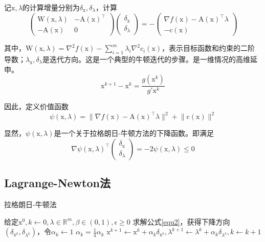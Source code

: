 \documentclass[a4paper]{D:/repositories/MyDGP/latex/PaperReadingLog}
\begin{document}
 记$\mathrm{x},\lambda$的计算增量分别为$\delta_\mathrm{x},\delta_\lambda$，计算
\begin{equation}    
    \label{equ2}
     \begin{pmatrix}
    \mathrm{W}(\mathrm{x},\lambda) & -\mathrm{A}(\mathrm{x})^\top\\
    -\mathrm{A}(\mathrm{x}) & 0
    \end{pmatrix}
    \begin{pmatrix}
    \delta_\mathrm{x}\\
    \delta_\lambda
    \end{pmatrix}
    =-
    \begin{pmatrix}
        \nabla f(\mathrm{x})-\mathrm{A}(\mathrm{x})^\top \lambda\\
        -\mathrm{c}(\mathrm{x})
    \end{pmatrix}
\end{equation}

其中，$\mathrm{W}(\mathrm{x},\lambda)=\nabla^2f(\mathrm{x})-\sum_{i=1}^m\lambda_i\nabla^2c_i(\mathrm{x})$，表示目标函数和约束的二阶导数；$\lambda_\mathrm{x},\delta_\lambda$是迭代方向。这是一个典型的牛顿迭代的步骤。是一维情况的高维延申。
$$
\mathrm{x}^{k+1}-\mathrm{x}^k=\frac{g(\mathrm{x}^k)}{g'\mathrm{x}^k}
$$

因此，定义价值函数
\begin{equation}
    \label{equ3}
    \psi(\mathrm{x},\lambda)=\lVert \nabla f(\mathrm{x})-\mathrm{A}(\mathrm{x})^\top \lambda\lVert^2+\lVert \mathrm{c}(\mathrm{x})\lVert ^2
\end{equation}

显然，$\psi(\mathrm{x},\lambda)$是一个关于拉格朗日-牛顿方法的下降函数。即满足
$$
    \nabla \psi(\mathrm{x},\lambda)^\top\begin{pmatrix}
        \delta_\mathrm{x}\\ \delta_\lambda
    \end{pmatrix}
    =-2\psi(\mathrm{x},\lambda)\le 0
$$

\subsection{Lagrange-Newton法}
\begin{algorithm}[H]
	\caption{拉格朗日-牛顿法} 
	\begin{algorithmic}[1]
		\STATE 给定$\mathrm{x}^0,k\leftarrow 0,\lambda\in\mathbb{R}^m,\beta\in(0,1),\epsilon\ge 0$
            \STATE 求解公式\ref{equ2}，获得下降方向$(\delta_{\mathrm{x}^k},\delta_{\lambda^k})$，令$\alpha_k\leftarrow 1$
                \STATE $\alpha_k=\frac{1}{4}\alpha_k$
            \ENDWHILE
            \STATE $\mathrm{x}^{k+1}\leftarrow \mathrm{x}^k+\alpha_k\delta_{\mathrm{x}^k},\lambda^{k+1}\leftarrow \lambda^k+\alpha_k\delta_{\lambda^k},k\leftarrow k+1$
        \ENDWHILE
	\end{algorithmic}
\end{algorithm}
\end{document}

